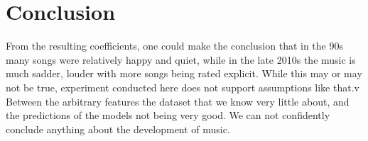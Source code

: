 \documentclass{article}
\begin{document}
\section{Conclusion}

From the resulting coefficients, one could make the conclusion that in the 90s many songs were relatively happy and quiet, while in the late 2010s the music is much sadder, louder with more songs being rated explicit. While this may or may not be true, experiment conducted here does not support assumptions like that.v Between the arbitrary features the dataset that we know very little about, and the predictions of the models not being very good. We can not confidently conclude anything about the development of music.

 
\end{document}

